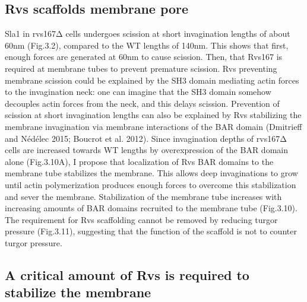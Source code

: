 {\subsection{Rvs scaffolds membrane pore}
Sla1 in rvs167Δ cells undergoes scission at short invagination lengths of about 60nm (Fig.3.2), compared to the WT lengths of 140nm. This shows that first, enough forces are generated at 60nm to cause scission. Then, that Rvs167 is required at membrane tubes to prevent premature scission. Rvs preventing membrane scission could be explained by the SH3 domain mediating actin forces to the invagination neck: one can imagine that the SH3 domain somehow decouples actin forces from the neck, and this delays scission. Prevention of scission at short invagination lengths can also be explained by Rvs stabilizing the membrane invagination via membrane interactions of the BAR domain (Dmitrieff and Nédélec 2015; Boucrot et al. 2012). Since invagination depths of rvs167Δ cells are increased towards WT lengths by overexpression of the BAR domain alone (Fig.3.10A), I propose that localization of Rvs BAR domains to the membrane tube stabilizes the membrane. This allows deep invaginations to grow until actin polymerization produces enough forces to overcome this stabilization and sever the membrane. Stabilization of the membrane tube increases with increasing amounts of BAR domains recruited to the membrane tube (Fig.3.10). The requirement for Rvs scaffolding cannot be removed by reducing turgor pressure (Fig.3.11), suggesting that the function of the scaffold is not to counter turgor pressure. 


\subsection{A critical amount of Rvs is required to stabilize the membrane }

}

